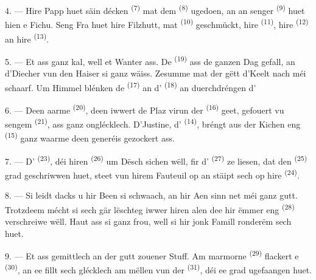 4. --- Hire Papp huet säin décken  \textsuperscript{(7)} mat
dem  \textsuperscript{(8)} ugedoen, an an senger 
\textsuperscript{(9)} huet hien e Fichu. Seng Fra huet hire Filzhutt, mat
 \textsuperscript{(10)} geschmückt, hire 
\textsuperscript{(11)}, hire  \textsuperscript{(12)} an hire
 \textsuperscript{(13)}.

5. --- Et ass ganz kal, well et Wanter ass. De 
\textsuperscript{(19)} ass de ganzen Dag gefall, an d'Diecher vun den Haiser si ganz
wäiss. Zesumme mat der  gëtt d'Keelt nach méi schaarf. Um Himmel
blénken de  \textsuperscript{(17)} an d'
\textsuperscript{(18)} an duerchdréngen d'

\VUsaut{4.2mm}
\VUsaut{3.0mm}

6. --- Deen aarme  \textsuperscript{(20)}, deen iwwert de Plaz
virun der  \textsuperscript{(16)} geet, gefouert vu sengem
 \textsuperscript{(21)}, ass ganz onglécklech. D'Justine,
d' \textsuperscript{(14)}, bréngt aus der Kichen eng
 \textsuperscript{(15)} ganz waarme  deen
generéis gezockert ass.

7. --- D' \textsuperscript{(23)}, déi hiren 
\textsuperscript{(26)} um Dësch sichen wëll, fir d'
\textsuperscript{(27)} ze liesen, dat den  \textsuperscript{(25)} grad
geschriwwen huet, steet vun hirem Fauteuil op an stäipt sech op hire 
\textsuperscript{(24)}.

8. --- Si leidt dacks u  hir Been si schwaach, an hir Aen sinn net méi ganz gutt. Trotzdeem mécht si
sech gär lëschteg iwwer hiren alen  dee hir ëmmer eng
 \textsuperscript{(28)} verschreiwe wëll. Haut ass si ganz frou, well
si hir jonk Famill ronderëm sech huet.

9. --- Et ass gemittlech an der gutt zouener Stuff. Am marmorne 
\textsuperscript{(29)} flackert e  \textsuperscript{(30)}, an ee
fillt sech glécklech am mëllen  vun der 
\textsuperscript{(31)}, déi ee grad ugefaangen huet.

